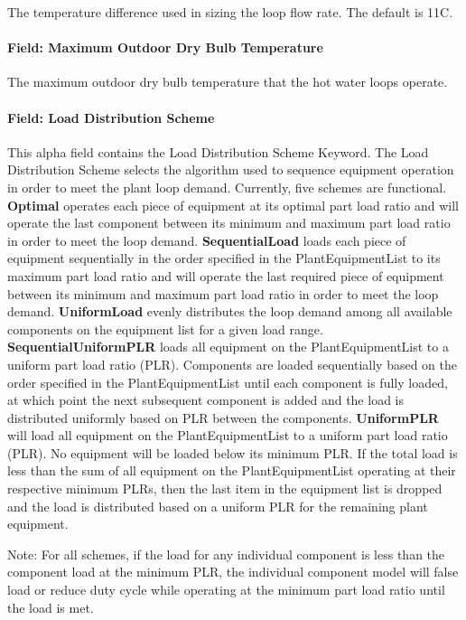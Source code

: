 The temperature difference used in sizing the loop flow rate. The default is 11C.

\paragraph{Field: Maximum Outdoor Dry Bulb Temperature}\label{field-maximum-outdoor-dry-bulb-temperature}

The maximum outdoor dry bulb temperature that the hot water loops operate.

\paragraph{Field: Load Distribution Scheme}\label{field-load-distribution-scheme}

This alpha field contains the Load Distribution Scheme Keyword. The Load Distribution Scheme selects the algorithm used to sequence equipment operation in order to meet the plant loop demand. Currently, five schemes are functional. \textbf{Optimal} operates each piece of equipment at its optimal part load ratio and will operate the last component between its minimum and maximum part load ratio in order to meet the loop demand. \textbf{SequentialLoad} loads each piece of equipment sequentially in the order specified in the PlantEquipmentList to its maximum part load ratio and will operate the last required piece of equipment between its minimum and maximum part load ratio in order to meet the loop demand. \textbf{UniformLoad} evenly distributes the loop demand among all available components on the equipment list for a given load range. \textbf{SequentialUniformPLR} loads all equipment on the PlantEquipmentList to a uniform part load ratio (PLR). Components are loaded sequentially based on the order specified in the PlantEquipmentList until each component is fully loaded, at which point the next subsequent component is added and the load is distributed uniformly based on PLR between the components. \textbf{UniformPLR} will load all equipment on the PlantEquipmentList to a uniform part load ratio (PLR). No equipment will be loaded below its minimum PLR. If the total load is less than the sum of all equipment on the PlantEquipmentList operating at their respective minimum PLRs, then the last item in the equipment list is dropped and the load is distributed based on a uniform PLR for the remaining plant equipment.

Note: For all schemes, if the load for any individual component is less than the component load at the minimum PLR, the individual component model will false load or reduce duty cycle while operating at the minimum part load ratio until the load is met.


